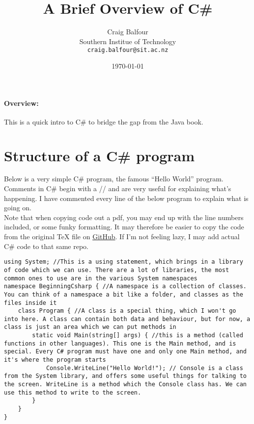 \documentclass{article}
\begin{document}
\title{A Brief Overview of C\#}
\author{Craig Balfour\\
        Southern Institue of Technology\\
	\texttt{craig.balfour@sit.ac.nz}}
\date{\today}
\maketitle

\paragraph{Overview:}
This is a quick intro to C\# to bridge the gap from the Java book.


\section{Structure of a C\# program}
Below is a very simple C\# program, the famous ``Hello World'' program.\\

Comments in C\# begin with a // and are very useful for explaining what's happening. I have commented every line of the below program to explain what is going on.\\

Note that when copying code out a pdf, you may end up with the line numbers included, or some funky formatting. It may therefore be easier to copy the code from the original TeX file on \href{https://github.com/balfourcraig/CSharpTutorial/tree/master/Intro}{GitHub}. If I'm not feeling lazy, I may add actual C\# code to that same repo.

\begin{lstlisting}
using System; //This is a using statement, which brings in a library of code which we can use. There are a lot of libraries, the most common ones to use are in the various System namespaces
namespace BeginningCsharp { //A namespace is a collection of classes. You can think of a namespace a bit like a folder, and classes as the files inside it
    class Program { //A class is a special thing, which I won't go into here. A class can contain both data and behaviour, but for now, a class is just an area which we can put methods in
        static void Main(string[] args) { //this is a method (called functions in other languages). This one is the Main method, and is special. Every C# program must have one and only one Main method, and it's where the program starts
            Console.WriteLine("Hello World!"); // Console is a class from the System library, and offers some useful things for talking to the screen. WriteLine is a method which the Console class has. We can use this method to write to the screen.
        }
    }
}
\end{lstlisting}
\end{document}
